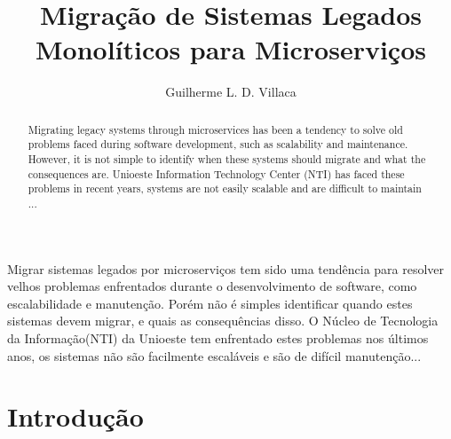 \documentclass[12pt]{article}
\title{Migração de Sistemas Legados Monolíticos para Microserviços}
\author{Guilherme L. D. Villaca\inst{1}}
\begin{document}
 

\maketitle

\begin{abstract}
Migrating legacy systems through microservices has been a tendency to solve old problems faced during software development, such as scalability and maintenance. However, it is not simple to identify when these systems should migrate and what the consequences are. Unioeste Information Technology Center (NTI) has faced these problems in recent years, systems are not easily scalable and are difficult to maintain ...
\end{abstract}
     
\begin{resumo} 
Migrar sistemas legados por microserviços tem sido uma tendência para resolver velhos problemas enfrentados durante o desenvolvimento de software, como escalabilidade e manutenção. Porém não é simples identificar quando estes sistemas devem migrar, e quais as consequências disso. O Núcleo de Tecnologia da Informação(NTI) da Unioeste tem enfrentado estes problemas nos últimos anos, os sistemas não são facilmente escaláveis e são de difícil manutenção...
\end{resumo}


\section{Introdução}
\end{document}
